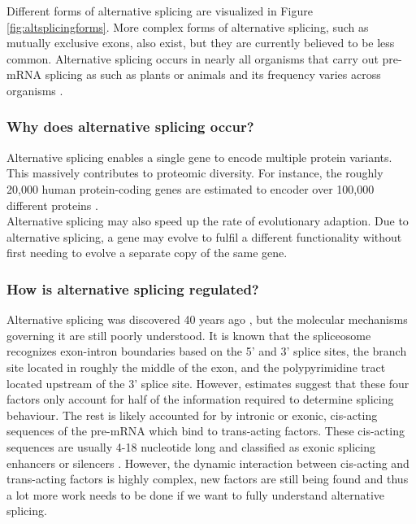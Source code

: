 Different forms of alternative splicing are visualized in Figure \ref{fig:altsplicingforms}. More complex forms of alternative splicing, such as mutually exclusive exons, also exist, but they are currently believed to be less common. Alternative splicing occurs in nearly all organisms that carry out pre-mRNA splicing as such as plants or animals and its frequency varies across organisms \cite{splicing_current_perspectives}. 
\subsubsection{Why does alternative splicing occur?}
Alternative splicing enables a single gene to encode multiple protein variants. This massively contributes to proteomic diversity. For instance, the roughly 20,000 human protein-coding genes are estimated to encoder over 100,000 different proteins \cite{splicing_current_perspectives}.\\ 
Alternative splicing may also speed up the rate of evolutionary adaption. Due to alternative splicing, a gene may evolve to fulfil a different functionality without first needing to evolve a separate copy of the same gene. \cite{bretschneiderphdthesis}
\subsubsection{How is alternative splicing regulated?}
Alternative splicing was discovered 40 years ago \cite{discoveryofsplicing}, but the molecular mechanisms governing it are still poorly understood. It is known that the spliceosome recognizes exon-intron boundaries based on the 5' and 3' splice sites, the branch site located in roughly the middle of the exon, and the polypyrimidine tract located upstream of the 3' splice site. However, estimates suggest that these four factors only account for half of the information required to determine splicing behaviour. The rest is likely accounted for by intronic or exonic, cis-acting sequences of the pre-mRNA which bind to trans-acting factors. These cis-acting sequences are usually 4-18 nucleotide long and classified as exonic splicing enhancers or silencers \cite{splicing_current_perspectives}.
However, the dynamic interaction between cis-acting and trans-acting factors is highly complex, new factors are still being found and thus a lot more work needs to be done if we want to fully understand alternative splicing.

